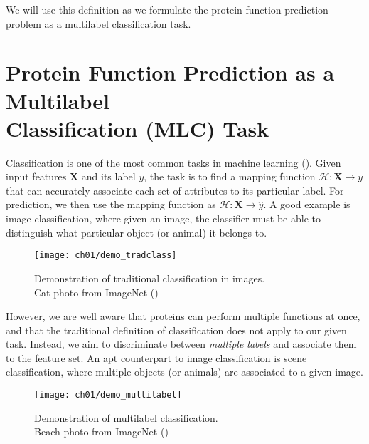\par We will use this definition as we formulate the protein function
prediction problem as a multilabel classification task.


\section[Protein Function Prediction as a Multilabel Classification Task]
{Protein Function Prediction as a Multilabel\\Classification  (MLC) Task}
\label{MultilabelClassification}

\par Classification is one of the most common tasks in machine learning
(\cite{herrera2016multilabel}). Given input features $\mathbf{X}$ and its
label $y$, the task is to find a mapping function $\mathcal{H}: \mathbf{X}
\rightarrow y$ that can accurately associate each set of attributes to its
particular label. For prediction, we then use the mapping function as
$\mathcal{H}: \mathbf{X} \rightarrow \widehat{y}$. A good example is image
classification, where given an image, the classifier must be able to
distinguish what particular object (or animal) it belongs to.

\begin{figure}[!h]
  \centering
  \texttt{[image: ch01/demo\_tradclass]}
  \caption[Demonstration of traditional classification in images]
  {Demonstration of traditional classification in images.\\Cat photo
  from ImageNet (\cite{russakovsky2015imagenet})}
  \label{demo:traditional}
\end{figure}

\par However, we are well aware that proteins can perform multiple functions at
once, and that the traditional definition of classification does not apply to our
given task. Instead, we aim to discriminate between \textit{multiple labels} and
associate them to the feature set. An apt counterpart to image classification is
scene classification, where multiple objects (or animals) are associated to a given
image.

\begin{figure}[!h]
  \centering
  \texttt{[image: ch01/demo\_multilabel]}
  \caption[Demonstration of multilabel classification]
  {Demonstration of multilabel classification.\\Beach photo
  from ImageNet (\cite{russakovsky2015imagenet})}
  \label{demo:multilabel}
\end{figure}

